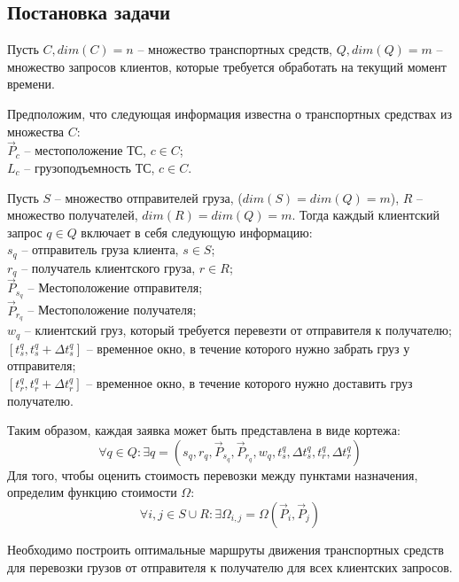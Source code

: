\documentclass[]{TAACpaper}
\begin{document}
\subsection{Постановка задачи}
Пусть $C,dim(C)=n$ -- множество транспортных средств, $Q,dim(Q)=m$ -- множество запросов клиентов, которые требуется обработать на текущий момент времени.

Предположим, что следующая информация известна о транспортных средствах из множества $C$: \\
$\vec{P}_c$ -- местоположение ТС, $c \in C$;\\
$L_c$ -- грузоподъемность ТС, $c \in C$.

Пусть $S$ -- множество отправителей груза, ($dim(S) = dim(Q) = m$), $R$ -- множество получателей, $dim(R) = dim(Q) = m$. Тогда каждый клиентский запрос $q \in Q$ включает в себя следующую информацию:\\
$s_q$ -- отправитель груза клиента, $s \in S$; \\
$r_q$ -- получатель клиентского груза, $r \in R$; \\
$\vec{P}_{s_q}$ -- Местоположение отправителя;\\
$\vec{P}_{r_q}$ -- Местоположение получателя; \\
$w_q$ -- клиентский груз, который требуется перевезти от отправителя к получателю; \\
$[t_{s}^{q}, t_{s}^{q}+ \Delta{t_{s}^{q}}]$ -- временное окно, в течение которого нужно забрать груз у отправителя;\\ 
$[t_{r}^{q}, t_{r}^{q}+ \Delta{t_{r}^{q}}]$ -- временное окно, в течение которого нужно доставить груз получателю.
 
Таким образом, каждая заявка может быть представлена в виде кортежа:
\begin{equation}
\forall q \in Q: \exists q = (s_q,r_q, \vec{P}_{s_q}, \vec{P}_{r_q}, w_q, t_{s}^{q}, \Delta{t_{s}^{q}}, t_{r}^{q}, \Delta{t_{r}^{q}})
\end{equation}
Для того, чтобы оценить стоимость перевозки между пунктами назначения, определим функцию стоимости $\Omega$:
\begin{equation}
\forall i,j \in S \cup R: \exists \Omega_{i,j} = \Omega(\vec{P}_i,\vec{P}_j)
\end{equation}

Необходимо построить оптимальные маршруты движения транспортных средств для перевозки грузов от отправителя к получателю для всех клиентских запросов.
\end{document}

